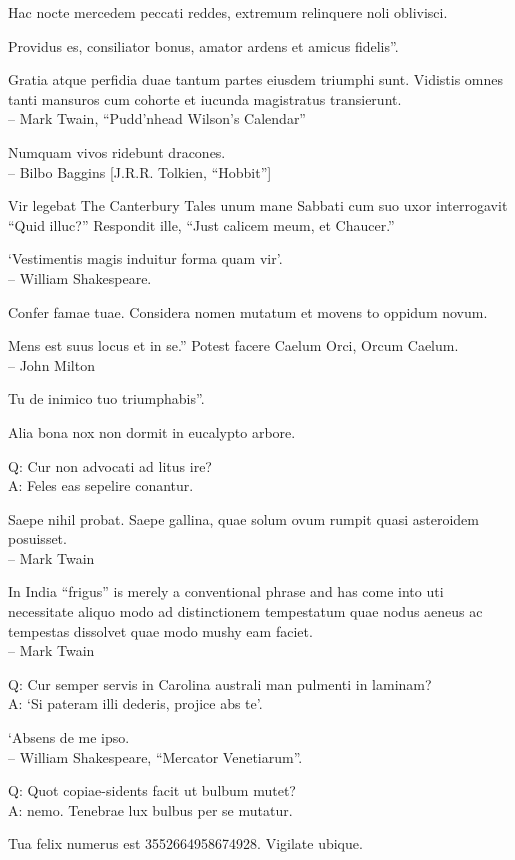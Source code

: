\documentclass[titlepage,12pt]{memoir}
\begin{document}
 Hac nocte mercedem peccati reddes, extremum relinquere noli oblivisci.

Providus es, consiliator bonus, amator ardens et amicus fidelis”.

 Gratia atque perfidia duae tantum partes eiusdem triumphi sunt.
Vidistis omnes tanti mansuros cum cohorte et iucunda
magistratus transierunt.
\\-- Mark Twain, “Pudd’nhead Wilson’s Calendar”

Numquam vivos ridebunt dracones.
\\-- Bilbo Baggins [J.R.R. Tolkien, “Hobbit”]

 Vir legebat The Canterbury Tales unum mane Sabbati cum suo
uxor interrogavit “Quid illuc?” Respondit ille, “Just calicem meum, et Chaucer.”

‘Vestimentis magis induitur forma quam vir’.
\\-- William Shakespeare.

Confer famae tuae. Considera nomen mutatum et movens to
oppidum novum.

Mens est suus locus et in se.”
Potest facere Caelum Orci, Orcum Caelum.
\\-- John Milton

Tu de inimico tuo triumphabis”.

Alia bona nox non dormit in eucalypto arbore.

Q: Cur non advocati ad litus ire?\\
A: Feles eas sepelire conantur.

Saepe nihil probat. Saepe gallina, quae solum ovum rumpit
quasi asteroidem posuisset.
\\-- Mark Twain

In India “frigus” is merely a conventional phrase and has come into
uti necessitate aliquo modo ad distinctionem tempestatum
quae nodus aeneus ac tempestas dissolvet quae modo mushy eam faciet.
\\-- Mark Twain

Q: Cur semper servis in Carolina australi man
pulmenti in laminam?\\
A: ‘Si pateram illi dederis, projice abs te’.

‘Absens de me ipso.
\\-- William Shakespeare, “Mercator Venetiarum”.

Q: Quot copiae-sidents facit ut bulbum mutet?\\
A: nemo. Tenebrae lux bulbus per se mutatur.

Tua felix numerus est 3552664958674928. Vigilate ubique.
\end{document}
